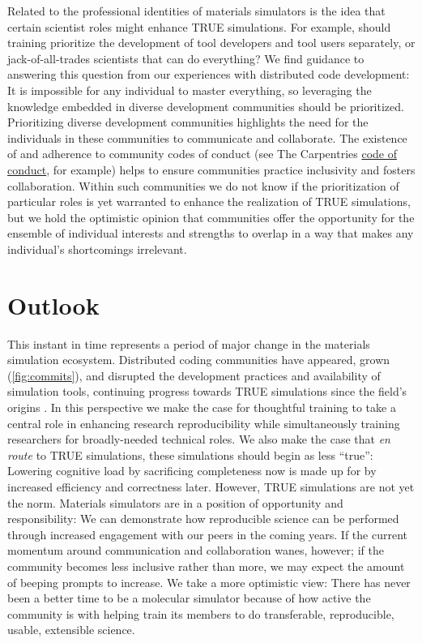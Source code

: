 Related to the professional identities of materials simulators is the idea that certain scientist roles might enhance TRUE simulations.
For example, should training prioritize the development of tool developers and tool users separately, or jack-of-all-trades scientists that can do everything?
We find guidance to answering this question from our experiences with distributed code development: 
It is impossible for any individual to master everything, so leveraging the knowledge embedded in diverse development communities should be prioritized.
Prioritizing diverse development communities highlights the need for the individuals in these communities to communicate and collaborate.
The existence of and adherence to community codes of conduct (see The Carpentries \href{https://docs.carpentries.org/topic_folders/policies/code-of-conduct.html}{code of conduct}, for example) helps to ensure communities practice inclusivity and fosters collaboration.
Within such communities we do not know if the prioritization of particular roles is yet warranted to enhance the realization of TRUE simulations, but we hold the optimistic opinion that communities offer the opportunity for the ensemble of individual interests and strengths to overlap in a way that makes any individual's shortcomings irrelevant.

\section{Outlook}
This instant in time represents a period of major change in the materials simulation ecosystem.
Distributed coding communities have appeared, grown (\autoref{fig:commits}), and disrupted the development practices and availability of simulation tools, continuing progress towards TRUE simulations since the field's origins \cite{Metropolis1953,Alder1957}.
In this perspective we make the case for thoughtful training to take a central role in enhancing research reproducibility while simultaneously training researchers for broadly-needed technical roles. 
We also make the case that \textit{en route} to TRUE simulations, these simulations should begin as less ``true'': Lowering cognitive load by sacrificing completeness now is made up for by increased efficiency and correctness later.
However, TRUE simulations are not yet the norm.
Materials simulators are in a position of opportunity and responsibility: We can demonstrate how reproducible science can be performed through increased engagement with our peers in the coming years.
If the current momentum around communication and collaboration wanes, however; if the community becomes less inclusive rather than more, we may expect the amount of beeping prompts to increase.
We take a more optimistic view: There has never been a better time to be a molecular simulator because of how active the community is with helping train its members to do transferable, reproducible, usable, extensible science. 

